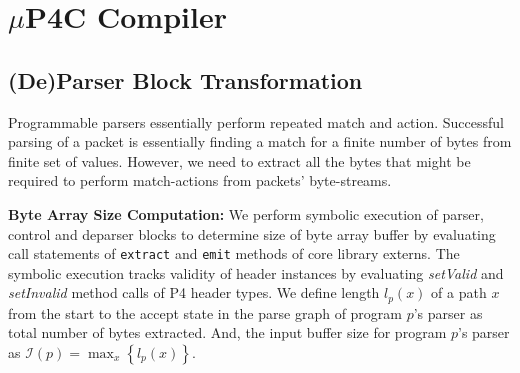 \documentclass{hotnets19}
\begin{document}
\section{$\mu$P4C Compiler}
\label{section-mp4c-compiler}

\subsection{(De)Parser Block Transformation}
\label{subsection:parser-block-transformation}

Programmable parsers essentially perform repeated match and action.
Successful parsing of a packet is essentially finding a match for a finite number of bytes from finite set of values.
However, we need to extract all the bytes that might be required to perform match-actions from packets' byte-streams.

\textbf{Byte Array Size Computation:} 
We perform symbolic execution of parser, control and deparser blocks to determine size of byte array buffer by evaluating call statements of \texttt{extract} and \texttt{emit} methods of core library externs. 
The symbolic execution tracks validity of header instances by evaluating \emph{setValid} and \emph{setInvalid} method calls of P4 header types.
We define length $l_{p}(x)$ of a path $x$ from the start to the accept state in the parse graph of program $p$'s parser as total number of bytes extracted.
And, the input buffer size for program $p$'s parser as $\mathcal{I}(p) = \max_{x}\left\{l_{p}(x)\right\}$. 
\end{document}
